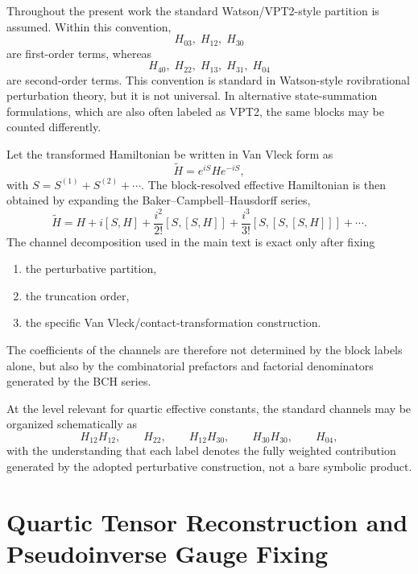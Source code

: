 \documentclass[journal=jacsat,manuscript=article]{achemso}
\begin{document}
Throughout the present work the standard Watson/VPT2-style partition is
assumed. Within this convention,
\begin{equation}
H_{03},\;H_{12},\;H_{30}
\end{equation}
are first-order terms, whereas
\begin{equation}
H_{40},\;H_{22},\;H_{13},\;H_{31},\;H_{04}
\end{equation}
are second-order terms. This convention is standard in Watson-style
rovibrational perturbation theory, but it is not universal. In alternative
state-summation formulations, which are also often labeled as VPT2, the same
blocks may be counted differently.

Let the transformed Hamiltonian be written in Van Vleck form as
\begin{equation}
\widetilde H = e^{iS} H e^{-iS},
\end{equation}
with $S=S^{(1)}+S^{(2)}+\cdots$. The block-resolved effective Hamiltonian is
then obtained by expanding the Baker--Campbell--Hausdorff series,
\begin{equation}
\widetilde H
=
H + i[S,H] + \frac{i^2}{2!}[S,[S,H]] + \frac{i^3}{3!}[S,[S,[S,H]]] + \cdots .
\end{equation}
The channel decomposition used in the main text is exact only after fixing
\begin{enumerate}
\item the perturbative partition,
\item the truncation order,
\item the specific Van Vleck/contact-transformation construction.
\end{enumerate}
The coefficients of the channels are therefore not determined by the block
labels alone, but also by the combinatorial prefactors and factorial
denominators generated by the BCH series.

At the level relevant for quartic effective constants, the standard channels
may be organized schematically as
\begin{equation}
H_{12}H_{12},\qquad H_{22},\qquad H_{12}H_{30},\qquad H_{30}H_{30},\qquad H_{04},
\end{equation}
with the understanding that each label denotes the fully weighted contribution
generated by the adopted perturbative construction, not a bare symbolic
product.

\section{Quartic Tensor Reconstruction and Pseudoinverse Gauge Fixing}
\end{document}
